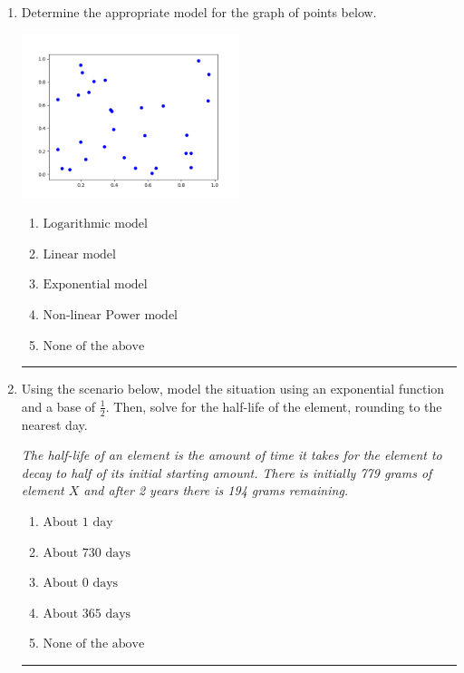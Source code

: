 \documentclass[14pt]{extbook}
\newcommand{\litem}[1]{\item#1\hspace*{-1cm}\rule{\textwidth}{0.4pt}}
\begin{document}
\begin{enumerate}
{\begin{enumerate}[label=\Alph*.]
\end{enumerate} }
\litem{
Determine the appropriate model for the graph of points below.
\begin{center}
    \includegraphics[width=0.5\textwidth]{../Figures/identifyModelGraph11C.png}
\end{center}
\begin{enumerate}[label=\Alph*.]
\item \( \text{Logarithmic model} \)
\item \( \text{Linear model} \)
\item \( \text{Exponential model} \)
\item \( \text{Non-linear Power model} \)
\item \( \text{None of the above} \)

\end{enumerate} }
\litem{
Using the scenario below, model the situation using an exponential function and a base of $\frac{1}{2}$. Then, solve for the half-life of the element, rounding to the nearest day.
\begin{center}
    \textit{ The half-life of an element is the amount of time it takes for the element to decay to half of its initial starting amount. There is initially 779 grams of element $X$ and after 2 years there is 194 grams remaining. }
\end{center}
\begin{enumerate}[label=\Alph*.]
\item \( \text{About } 1 \text{ day} \)
\item \( \text{About } 730 \text{ days} \)
\item \( \text{About } 0 \text{ days} \)
\item \( \text{About } 365 \text{ days} \)
\item \( \text{None of the above} \)


\end{enumerate}}
\end{enumerate}
\end{document}
